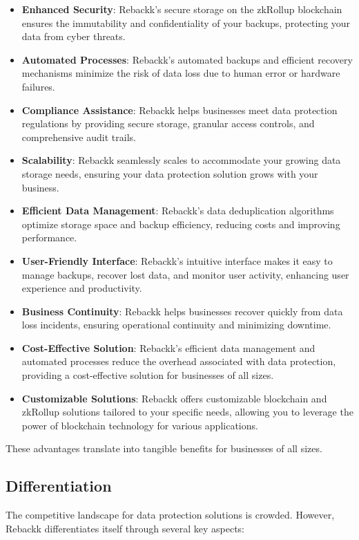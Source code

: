 \documentclass[12pt]{article}
\begin{document}
\begin{itemize}
    \item \textbf{Enhanced Security}: Rebackk's secure storage on the zkRollup blockchain ensures the immutability and confidentiality of your backups, protecting your data from cyber threats.
    \item \textbf{Automated Processes}: Rebackk's automated backups and efficient recovery mechanisms minimize the risk of data loss due to human error or hardware failures.
    \item \textbf{Compliance Assistance}: Rebackk helps businesses meet data protection regulations by providing secure storage, granular access controls, and comprehensive audit trails.
    \item \textbf{Scalability}: Rebackk seamlessly scales to accommodate your growing data storage needs, ensuring your data protection solution grows with your business.
    \item \textbf{Efficient Data Management}: Rebackk's data deduplication algorithms optimize storage space and backup efficiency, reducing costs and improving performance.
    \item \textbf{User-Friendly Interface}: Rebackk's intuitive interface makes it easy to manage backups, recover lost data, and monitor user activity, enhancing user experience and productivity.
    \item \textbf{Business Continuity}: Rebackk helps businesses recover quickly from data loss incidents, ensuring operational continuity and minimizing downtime.
    \item \textbf{Cost-Effective Solution}: Rebackk's efficient data management and automated processes reduce the overhead associated with data protection, providing a cost-effective solution for businesses of all sizes.
    \item \textbf{Customizable Solutions}: Rebackk offers customizable blockchain and zkRollup solutions tailored to your specific needs, allowing you to leverage the power of blockchain technology for various applications.
\end{itemize}

These advantages translate into tangible benefits for businesses of all sizes.

\subsection{Differentiation}
The competitive landscape for data protection solutions is crowded. However, Rebackk differentiates itself through several key aspects:
\end{document}
